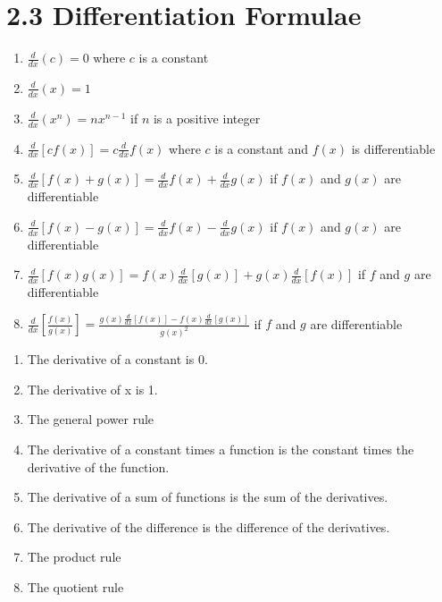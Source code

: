 %
%

\section*{2.3 Differentiation Formulae}

\begin{enumerate}
    \item \(\frac{d}{dx}(c)=0\) \quad where \(c\) is a constant
    \item \(\frac{d}{dx}(x)=1\)
    \item \(\frac{d}{dx}(x^n)=nx^{n-1}\) \quad if \(n\) is a positive integer
    \item \(\frac{d}{dx}[cf(x)]=c\frac{d}{dx}f(x)\) \quad where \(c\) is a constant and \(f(x)\) is differentiable
    \item \(\frac{d}{dx}[f(x)+g(x)]=\frac{d}{dx}f(x)+\frac{d}{dx}g(x)\) \quad if \(f(x)\) and \(g(x)\) are differentiable
    \item \(\frac{d}{dx}[f(x)-g(x)]=\frac{d}{dx}f(x)-\frac{d}{dx}g(x)\) \quad if \(f(x)\) and \(g(x)\) are differentiable
    \item \(\frac{d}{dx}[f(x)g(x)]=f(x)\frac{d}{dx}[g(x)]+g(x)\frac{d}{dx}[f(x)]\) \quad if \(f\) and \(g\) are differentiable
    \item \(\frac{d}{dx}[\frac{f(x)}{g(x)}]=\frac{g(x)\frac{d}{dx}[f(x)]-f(x)\frac{d}{dx}[g(x)]}{g(x)^2}\) \quad if \(f\) and \(g\) are differentiable
\end{enumerate}
\begin{enumerate}
    \item The derivative of a constant is 0.
    \item The derivative of x is 1.
    \item The general power rule
    \item The derivative of a constant times a function is the constant times the derivative of the function.
    \item The derivative of a sum of functions is the sum of the derivatives.
    \item The derivative of the difference is the difference of the derivatives.
    \item The product rule
    \item The quotient rule
\end{enumerate}
